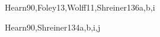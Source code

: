 \begin{syllabus}
\begin{unit}{\GVAdvancedRendering}{}{Hearn90,Foley13,Wolff11,Shreiner13}{6}{a,b,i}
   \begin{topics} 
        \item \GVAdvancedRenderingTopicTime
        \item \GVAdvancedRenderingTopicShadow
        \item \GVAdvancedRenderingTopicOcclusion
        \item \GVAdvancedRenderingTopicSubsurface
        \item \GVAdvancedRenderingTopicNon
        \item \GVAdvancedRenderingTopicGpu
        \item \GVAdvancedRenderingTopicHuman
   \end{topics}

   \begin{learningoutcomes} 
        \item \GVAdvancedRenderingLODemonstrateHowEstimates [\Assessment]
        \item \GVAdvancedRenderingLOProveThe [\Assessment]
        \item \GVAdvancedRenderingLOImplementAShading [\Usage]
        \item \GVAdvancedRenderingLODiscussHow [\Familiarity]
        \item \GVAdvancedRenderingLOExplainHowThe [\Familiarity]
   \end{learningoutcomes}
\end{unit}

\begin{unit}{\GVComputerAnimation}{}{Hearn90,Shreiner13}{4}{a,b,i,j}
   \begin{topics} 
        \item \GVComputerAnimationTopicForward
        \item \GVComputerAnimationTopicCollision
        \item \GVComputerAnimationTopicProcedural
        \item \GVComputerAnimationTopicSkinning
        \item \GVComputerAnimationTopicPhysics
        \item \GVComputerAnimationTopicKey
        \item \GVComputerAnimationTopicSplines
        \item \GVComputerAnimationTopicData
        \item \GVComputerAnimationTopicCamera
        \item \GVComputerAnimationTopicMotion
   \end{topics}


\end{unit}
\end{syllabus}
